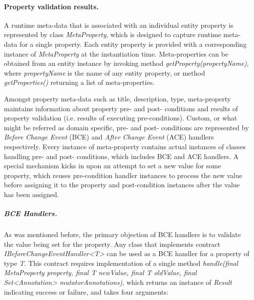   \paragraph*{Property validation results.}

  A runtime meta-data that is associated with an individual entity property is represented by class \emph{MetaProperty}, which is designed to capture runtime meta-data for a single property.
  Each entity property is provided with a corresponding instance of \emph{MetaProperty} at the instantiation time.
  Meta-properties can be obtained from an entity instance by invoking method \emph{getProperty(propertyName)}, where \emph{propertyName} is the name of any entity property, or method \emph{getProperties()} returning a list of meta-properties.

  Amongst property meta-data such as title, description, type, meta-property maintains information about property pre- and post- conditions and results of property validation (i.e. results of executing pre-conditions).
  Custom, or what might be referred as domain specific, pre- and post- conditions are represented by \emph{Before Change Event} (BCE) and \emph{After Change Event} (ACE) handlers respectively.
  Every instance of meta-property contains actual instances of classes handling pre- and post- conditions, which includes BCE and ACE handlers.
  A special mechanism kicks in upon an attempt to set a new value for some property, which reuses pre-condition handler instances to process the new value before assigning it to the property and post-condition instances after the value has been assigned.

  \subparagraph*{BCE Handlers.}
  As was mentioned before, the primary objection of BCE handlers is to validate the value being set for the property.
  Any class that implements contract \emph{IBeforeChangeEventHandler<T>} can be used as a BCE handler for a property of type \emph{T}.
  This contract requires implementation of a single method \emph{handle(final MetaProperty property, final T newValue, final T oldValue, final Set<Annotation> mutatorAnnotations)}, which returns an instance of \emph{Result} indicating success or failure, and takes four arguments:

